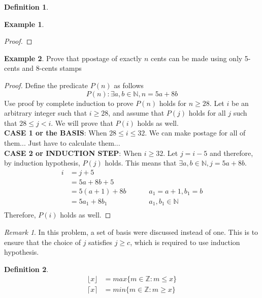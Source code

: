 \documentclass[11pt]{article}
\theoremstyle{plain}%
\theoremstyle{definition}
\newtheorem{defn}{Definition}
\newtheorem{exmp}{Example}[defn]
\theoremstyle{remark}
\newtheorem*{rem}{Remark}
\begin{document}
\begin{defn}
\begin{exmp}
\begin{proof}
    \end{proof}
  \end{exmp}

  \begin{exmp}
    Prove that ppostage of exactly $n$ cents can be made using only 5-cents and 8-cents stamps
    \begin{proof}
      Define the predicate $P(n)$ as follows
      \[
        P(n): \exists a,b\in\mathbb{N}, n = 5a + 8b
      \]
      Use proof by complete induction to prove $P(n)$ holds for $n \geq 28$. Let $i$ be an arbitrary integer such that $i\geq 28$, and assume that $P(j)$ holds for all $j$ such that $28 \leq j < i$. We will prove that $P(i)$ holds as well. \\
      \textbf{CASE 1 or the BASIS}: When $28 \leq i \leq 32$. We can make postage for all of them... Just have to calculate them... \\
      \textbf{CASE 2 or INDUCTION STEP}: When $i\geq 32$. Let $j = i-5$ and therefore, by induction hypothesis, $P(j)$ holds. This means that $\exists a,b \in\mathbb{N}, j=5a + 8b$.
      \[
        \begin{align}
          i &= j + 5 \\
          &= 5a + 8b + 5\\
          &= 5(a+1) + 8b && &&\text{$a_1 = a + 1, b_1 = b$}\\
          &= 5a_1 + 8b_1 && &&\text{$a_1, b_1 \in\mathbb{N}$}\\
        \end{align}
      \]
      Therefore, $P(i)$ holds as well.
    \end{proof}
    \begin{rem}
      In this problem, a set of basis were discussed instead of one. This is to ensure that the choice of $j$ satisfies $j \geq c$, which is required to use induction hypothesis.
    \end{rem}
  \end{exmp}

\end{defn}

\begin{defn}
  \label{floor and ceiling}
  \[
    \begin{align}
      \lfloor x \rfloor &= max\{ m\in \mathbb{Z}: m \leq x\} \\
      \lceil x \rceil &= min\{ m\in \mathbb{Z}: m \geq x\}
    \end{align}
  \]


\end{defn}



\end{document}
